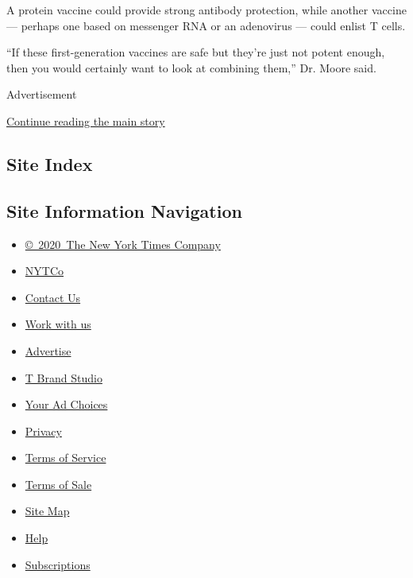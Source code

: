 A protein vaccine could provide strong antibody protection, while
another vaccine --- perhaps one based on messenger RNA or an adenovirus
--- could enlist T cells.

``If these first-generation vaccines are safe but they're just not
potent enough, then you would certainly want to look at combining
them,'' Dr. Moore said.

Advertisement

\protect\hyperlink{after-bottom}{Continue reading the main story}

\hypertarget{site-index}{%
\subsection{Site Index}\label{site-index}}

\hypertarget{site-information-navigation}{%
\subsection{Site Information
Navigation}\label{site-information-navigation}}

\begin{itemize}
\tightlist
\item
  \href{https://help.nytimes.com/hc/en-us/articles/115014792127-Copyright-notice}{©~2020~The
  New York Times Company}
\end{itemize}

\begin{itemize}
\tightlist
\item
  \href{https://www.nytco.com/}{NYTCo}
\item
  \href{https://help.nytimes.com/hc/en-us/articles/115015385887-Contact-Us}{Contact
  Us}
\item
  \href{https://www.nytco.com/careers/}{Work with us}
\item
  \href{https://nytmediakit.com/}{Advertise}
\item
  \href{http://www.tbrandstudio.com/}{T Brand Studio}
\item
  \href{https://www.nytimes.com/privacy/cookie-policy\#how-do-i-manage-trackers}{Your
  Ad Choices}
\item
  \href{https://www.nytimes.com/privacy}{Privacy}
\item
  \href{https://help.nytimes.com/hc/en-us/articles/115014893428-Terms-of-service}{Terms
  of Service}
\item
  \href{https://help.nytimes.com/hc/en-us/articles/115014893968-Terms-of-sale}{Terms
  of Sale}
\item
  \href{https://spiderbites.nytimes.com}{Site Map}
\item
  \href{https://help.nytimes.com/hc/en-us}{Help}
\item
  \href{https://www.nytimes.com/subscription?campaignId=37WXW}{Subscriptions}
\end{itemize}
